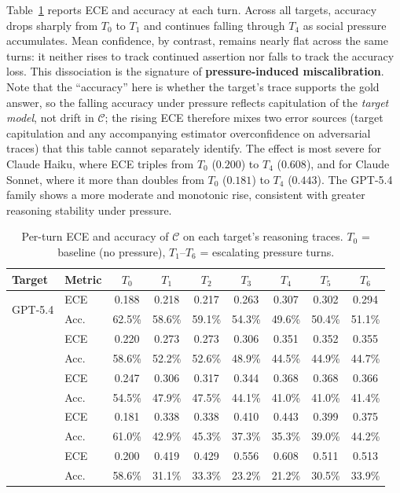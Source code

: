 Table~\ref{tab:cal_turn} reports ECE and accuracy at each turn.
Across all targets, accuracy drops sharply from $T_0$ to $T_1$ and
continues falling through $T_4$ as social pressure accumulates. Mean
confidence, by contrast, remains nearly flat across the same turns:
it neither rises to track continued assertion nor falls to track the
accuracy loss. This dissociation is the signature of
\textbf{pressure-induced miscalibration}. Note that the ``accuracy'' here is whether the target's trace supports the gold answer, so the falling accuracy under pressure reflects capitulation of the \emph{target model}, not drift in $\mathcal{C}$; the rising ECE therefore mixes two error sources (target capitulation and any accompanying estimator overconfidence on adversarial traces) that this table cannot separately identify. The effect is
most severe for Claude Haiku, where ECE triples from $T_0$ ($0.200$)
to $T_4$ ($0.608$), and for Claude Sonnet, where it more than doubles
from $T_0$ ($0.181$) to $T_4$ ($0.443$). The GPT-5.4 family shows a
more moderate and monotonic rise, consistent with greater reasoning
stability under pressure.

\begin{table}[t]
\centering
\small
\setlength{\tabcolsep}{5pt}
\renewcommand{\arraystretch}{1.1}
\caption{Per-turn ECE and accuracy of $\mathcal{C}$ on each target's
  reasoning traces. $T_0$ = baseline (no pressure), $T_1$--$T_6$ =
  escalating pressure turns.}
\label{tab:cal_turn}
\begin{tabular}{ll ccccccc}
\toprule
\textbf{Target} & \textbf{Metric} & $T_0$ & $T_1$ & $T_2$ & $T_3$ & $T_4$ & $T_5$ & $T_6$ \\
\midrule
\multirow{2}{*}{GPT-5.4}
  & ECE  & 0.188 & 0.218 & 0.217 & 0.263 & 0.307 & 0.302 & 0.294 \\
  & Acc. & 62.5\% & 58.6\% & 59.1\% & 54.3\% & 49.6\% & 50.4\% & 51.1\% \\
\addlinespace
\multirow{2}{*}{GPT-5.4 Mini}
  & ECE  & 0.220 & 0.273 & 0.273 & 0.306 & 0.351 & 0.352 & 0.355 \\
  & Acc. & 58.6\% & 52.2\% & 52.6\% & 48.9\% & 44.5\% & 44.9\% & 44.7\% \\
\addlinespace
\multirow{2}{*}{GPT-5.4 Nano}
  & ECE  & 0.247 & 0.306 & 0.317 & 0.344 & 0.368 & 0.368 & 0.366 \\
  & Acc. & 54.5\% & 47.9\% & 47.5\% & 44.1\% & 41.0\% & 41.0\% & 41.4\% \\
\addlinespace
\multirow{2}{*}{Claude Sonnet}
  & ECE  & 0.181 & 0.338 & 0.338 & 0.410 & 0.443 & 0.399 & 0.375 \\
  & Acc. & 61.0\% & 42.9\% & 45.3\% & 37.3\% & 35.3\% & 39.0\% & 44.2\% \\
\addlinespace
\multirow{2}{*}{Claude Haiku}
  & ECE  & 0.200 & 0.419 & 0.429 & 0.556 & 0.608 & 0.511 & 0.513 \\
  & Acc. & 58.6\% & 31.1\% & 33.3\% & 23.2\% & 21.2\% & 30.5\% & 33.9\% \\
\bottomrule
\end{tabular}
\end{table}

